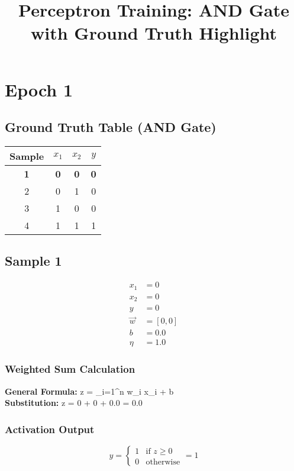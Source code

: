 \documentclass{article}
\begin{document}
\title{Perceptron Training: AND Gate with Ground Truth Highlight}
\maketitle
\section*{Epoch 1}
\subsection*{Ground Truth Table (AND Gate)}
\begin{center}
\begin{tabular}{|c|c|c|c|}
\hline
\textbf{Sample} & $x_1$ & $x_2$ & $y$ \\
\hline
\rowcolor{yellow} \textbf{1} & \textbf{0} & \textbf{0} & \textbf{0} \\
\hline
2 & 0 & 1 & 0 \\
\hline
3 & 1 & 0 & 0 \\
\hline
4 & 1 & 1 & 1 \\
\hline
\end{tabular}
\end{center}

\subsection*{Sample 1}
\begin{align*}
x_1 &= 0 \\
x_2 &= 0 \\
y &= 0 \\
\vec{w} &= [0, 0] \\
b &= 0.0 \\
\eta &= 1.0
\end{align*}

\subsubsection*{Weighted Sum Calculation}
\textbf{General Formula:} \quad
z = \sum_{i=1}^{n} w_i x_i + b
\\
\textbf{Substitution:} \quad
z = 0  + 0  + 0.0 = 0.0

\subsubsection*{Activation Output}
\[
\hat{y} =
\begin{cases}
1 & \text{if } z \geq 0 \\
0 & \text{otherwise}
\end{cases}
= 1
\]
\end{document}
